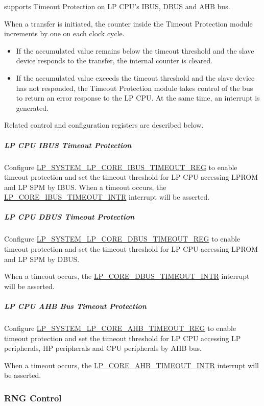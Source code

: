 \documentclass[main\_\_EN.tex]{subfiles}
\begin{document}
\chipname{} supports Timeout Protection on LP CPU's IBUS, DBUS and AHB bus.

When a transfer is initiated, the counter inside the Timeout Protection module increments by one on each clock cycle.

\begin{itemize}
    \item If the accumulated value remains below the timeout threshold and the slave device responds to the transfer, the internal counter is cleared.
    \item If the accumulated value exceeds the timeout threshold and the slave device has not responded, the Timeout Protection module takes control of the bus to return an error response to the LP CPU. At the same time, an interrupt is generated.
\end{itemize}

Related control and configuration registers are described below.


\subparagraph{LP CPU IBUS Timeout Protection}

Configure \hyperref[regdesc:LPSYSTEMLPCOREIBUSTIMEOUTREG]{LP\_SYSTEM\_LP\_CORE\_IBUS\_TIMEOUT\_REG} to enable timeout protection and set the timeout threshold for LP CPU accessing LPROM and LP SPM by IBUS.
When a timeout occurs, the \hyperref[tab:sysreg-int-sources]{LP\_CORE\_IBUS\_TIMEOUT\_INTR} interrupt will be asserted.

\subparagraph{LP CPU DBUS Timeout Protection}

Configure \hyperref[regdesc:LPSYSTEMLPCOREDBUSTIMEOUTREG]{LP\_SYSTEM\_LP\_CORE\_DBUS\_TIMEOUT\_REG} to enable timeout protection and set the timeout threshold for LP CPU accessing LPROM and LP SPM by DBUS.

When a timeout occurs, the \hyperref[tab:sysreg-int-sources]{LP\_CORE\_DBUS\_TIMEOUT\_INTR} interrupt will be asserted.

\subparagraph{LP CPU AHB Bus Timeout Protection}

Configure \hyperref[regdesc:LPSYSTEMLPCOREAHBTIMEOUTREG]{LP\_SYSTEM\_LP\_CORE\_AHB\_TIMEOUT\_REG} to enable timeout protection and set the timeout threshold for LP CPU accessing LP peripherals, HP peripherals and CPU peripherals by AHB bus.

When a timeout occurs, the \hyperref[tab:sysreg-int-sources]{LP\_CORE\_AHB\_TIMEOUT\_INTR} interrupt will be asserted.


\subsubsection{RNG Control}
\end{document}
